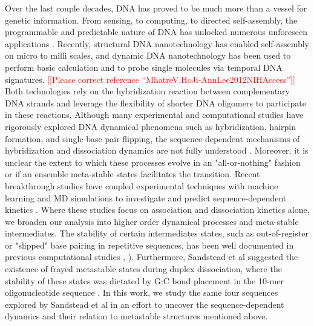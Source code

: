 \documentclass[journal=jpcbfk,manuscript=article]{achemso}
\newcommand*{\noter}[1]{\textcolor{red}{[[#1]]}}		%
\begin{document}
Over the last couple decades, DNA has proved to be much more than a vessel for genetic information. From sensing, to computing, to directed self-assembly, the programmable and predictable nature of DNA has unlocked numerous unforeseen applications \citep{Seeman2017DNANanotechnology, Adleman1994MolecularProblems.pdf, Rothemund2006FoldingPatterns, Gu2010ALine}. Recently, structural DNA nanotechnology has enabled self-assembly on micro to milli scales, and dynamic DNA nanotechnology has been used to perform basic calculation and to probe single molecules via temporal DNA signatures\citep{MhatreV.HoJi-AnnLee2012NIHAccess, Bui2018, Shah2019}. \noter{Please correct reference ``MhatreV.HoJi-AnnLee2012NIHAccess''} Both technologies rely on the hybridization reaction between complementary DNA strands and leverage the flexibility of shorter DNA oligomers to participate in these reactions. Although many experimental and computational studies have rigorously explored DNA dynamical phenomena such as hybridization, hairpin formation, and single base pair flipping, the sequence-dependent mechanisms of hybridization and dissociation dynamics are not fully understood \citep{Yin2011KineticsHybridization, Xiao2019}. Moreover, it is unclear the extent to which these processes evolve in an "all-or-nothing" fashion or if an ensemble meta-stable states facilitates the transition. Recent breakthrough studies have coupled experimental techniques with machine learning and MD simulations to investigate and predict sequence-dependent kinetics \citep{Schickinger2018TetheredHelices, Zhang2018PredictingSequence}. Where these studies focus on association and dissociation kinetics alone, we broaden our analysis into higher order dynamical processes and meta-stable intermediates. The stability of certain intermediates states, such as out-of-register or "slipped" base pairing in repetitive sequences, has been well documented in previous computational studies \citep{Phys2014}, \citep{Xiao2019}). Furthermore, Sandstead et al suggested the existence of frayed metastable states during duplex dissociation, where the stability of these states was dictated by G:C bond placement in the 10-mer oligonucleotide sequence \citep{Sanstead2016}. In this work, we study the same four sequences explored by Sandstead et al in an effort to uncover the sequence-dependent dynamics and their relation to  metastable structures mentioned above.
\end{document}
